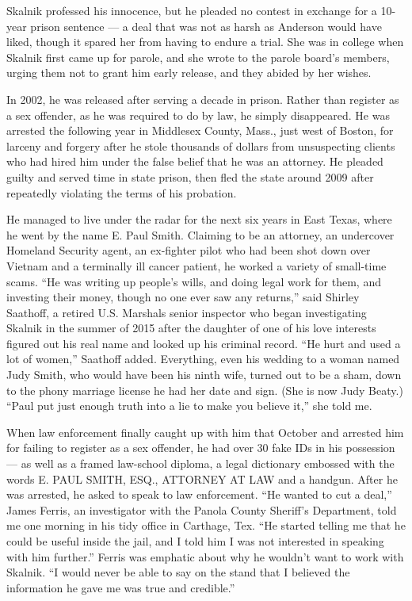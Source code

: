 Skalnik professed his innocence, but he pleaded no contest in exchange
for a 10-year prison sentence --- a deal that was not as harsh as
Anderson would have liked, though it spared her from having to endure a
trial. She was in college when Skalnik first came up for parole, and she
wrote to the parole board's members, urging them not to grant him early
release, and they abided by her wishes.

In 2002, he was released after serving a decade in prison. Rather than
register as a sex offender, as he was required to do by law, he simply
disappeared. He was arrested the following year in Middlesex County,
Mass., just west of Boston, for larceny and forgery after he stole
thousands of dollars from unsuspecting clients who had hired him under
the false belief that he was an attorney. He pleaded guilty and served
time in state prison, then fled the state around 2009 after repeatedly
violating the terms of his probation.

He managed to live under the radar for the next six years in East Texas,
where he went by the name E. Paul Smith. Claiming to be an attorney, an
undercover Homeland Security agent, an ex-fighter pilot who had been
shot down over Vietnam and a terminally ill cancer patient, he worked a
variety of small-time scams. ``He was writing up people's wills, and
doing legal work for them, and investing their money, though no one ever
saw any returns,'' said Shirley Saathoff, a retired U.S. Marshals senior
inspector who began investigating Skalnik in the summer of 2015 after
the daughter of one of his love interests figured out his real name and
looked up his criminal record. ``He hurt and used a lot of women,''
Saathoff added. Everything, even his wedding to a woman named Judy
Smith, who would have been his ninth wife, turned out to be a sham, down
to the phony marriage license he had her date and sign. (She is now Judy
Beaty.) ``Paul put just enough truth into a lie to make you believe
it,'' she told me.

When law enforcement finally caught up with him that October and
arrested him for failing to register as a sex offender, he had over 30
fake IDs in his possession --- as well as a framed law-school diploma, a
legal dictionary embossed with the words E. PAUL SMITH, ESQ., ATTORNEY
AT LAW and a handgun. After he was arrested, he asked to speak to law
enforcement. ``He wanted to cut a deal,'' James Ferris, an investigator
with the Panola County Sheriff's Department, told me one morning in his
tidy office in Carthage, Tex. ``He started telling me that he could be
useful inside the jail, and I told him I was not interested in speaking
with him further.'' Ferris was emphatic about why he wouldn't want to
work with Skalnik. ``I would never be able to say on the stand that I
believed the information he gave me was true and credible.''

